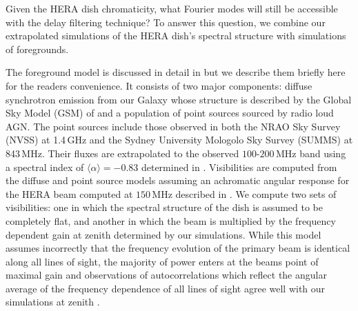 \documentclass[twocolumn]{emulateapj}
\begin{document}
Given the HERA dish chromaticity, what Fourier modes will still be accessible with the delay filtering technique? To answer this question, we combine our extrapolated simulations of the HERA dish's spectral structure with simulations of foregrounds. 

The foreground model is discussed in detail in \citet{Thyagarajan:2016} but we describe them briefly here for the readers convenience. It consists of two major components: diffuse synchrotron emission from our Galaxy whose structure is described by the Global Sky Model (GSM) of \citet{deOliveiraCosta:2008} and a population of point sources sourced by radio loud AGN. The point sources include those observed in both the NRAO Sky Survey (NVSS) \citep{Condon:1998} at 1.4\,GHz and the Sydney University Mologolo Sky Survey (SUMMS) \citep{Bock:1999} at 843\,MHz. Their fluxes are extrapolated to the observed $100$-$200$\,MHz band using a spectral index of $\langle \alpha \rangle=-0.83$ determined in \citet{Mauch:2003}. Visibilities are computed from the diffuse and point source models assuming an achromatic angular response for the HERA beam computed at $150$\,MHz described in \citet{Neben:2016}. We compute two sets of visibilities: one in which the spectral structure of the dish is assumed to be completely flat, and another in which the beam is multiplied by the frequency dependent gain at zenith determined by our simulations. While this model assumes incorrectly that the frequency evolution of the primary beam is identical along all lines of sight, the majority of power enters at the beams point of maximal gain and observations of autocorrelations which reflect the angular average of the frequency dependence of all lines of sight agree well with our simulations at zenith \citep{Patra:2016}. 
\end{document}
